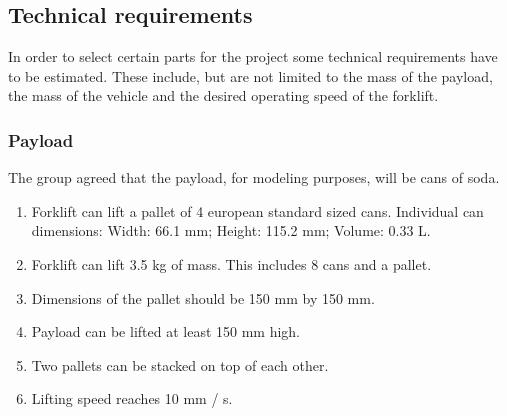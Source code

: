 \documentclass{article}
\begin{document}
    \subsection{Technical requirements}
        In order to select certain parts for the project some technical requirements 
        have to be estimated. These include, but are not limited to the mass of the 
        payload, the mass of the vehicle and the desired operating speed of the 
        forklift.

        \subsubsection{Payload} %
           The group agreed that the payload, for modeling purposes, will be cans of soda.
           \begin{center}
                \begin{enumerate}
                    \item Forklift can lift a pallet of 4 european standard sized cans. Individual can dimensions: Width: 66.1 mm; Height: 115.2 mm; Volume: 0.33 L. %
                    \item Forklift can lift  3.5 kg of mass. This includes 8 cans and a pallet. %
                    \item Dimensions of the pallet should be 150 mm by 150 mm. %
                    \item Payload can be lifted at least 150 mm high. %
                    \item Two pallets can be stacked on top of each other.
                    \item Lifting speed reaches 10 mm / s. %
                \end{enumerate}
            \end{center}
\end{document}
